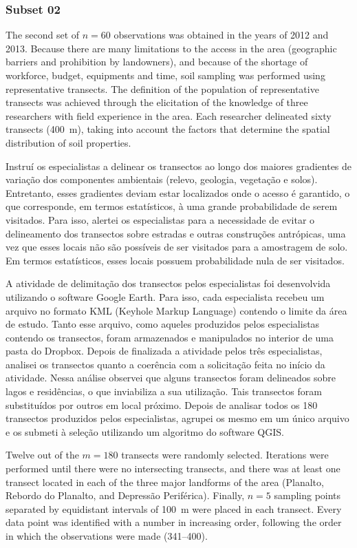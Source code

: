 \subsubsection{Subset 02}

The second set of $n = 60$ observations was obtained in the years of \num{2012} and \num{2013}. Because
there are many limitations to the access in the area (geographic barriers and prohibition by landowners),
and because of the shortage of workforce, budget, equipments and time, soil sampling was performed using 
representative transects. The definition of the population of representative transects was achieved through 
the elicitation of the knowledge of three researchers with field experience in the area. Each researcher 
delineated sixty transects (\SI{400}{\metre}), taking into account the factors that determine the spatial
distribution of soil properties.

Instruí os especialistas a delinear os transectos ao longo dos maiores gradientes de variação dos componentes ambientais (relevo, geologia, vegetação e solos). Entretanto, esses gradientes deviam estar localizados onde o acesso é garantido, o que corresponde, em termos estatísticos, à uma grande probabilidade de serem visitados. Para isso, alertei os especialistas para a necessidade de evitar o delineamento dos transectos sobre estradas e outras construções antrópicas, uma vez que esses locais não são possíveis de ser visitados para a amostragem de solo. Em termos estatísticos, esses locais possuem probabilidade nula de ser visitados.

A atividade de delimitação dos transectos pelos especialistas foi desenvolvida utilizando o software Google Earth. Para isso, cada especialista recebeu um arquivo no formato KML (Keyhole Markup Language) contendo o limite da área de estudo. Tanto esse arquivo, como aqueles produzidos pelos especialistas contendo os transectos, foram armazenados e manipulados no interior de uma pasta do Dropbox. Depois de finalizada a atividade pelos três especialistas, analisei os transectos quanto a coerência com a solicitação feita no início da atividade. Nessa análise observei que alguns transectos foram delineados sobre lagos e residências, o que inviabiliza a sua utilização. Tais transectos foram substituídos por outros em local próximo. Depois de analisar todos os 180 transectos produzidos pelos especialistas, agrupei os mesmo em um único arquivo e os submeti à seleção utilizando um algoritmo do software QGIS.

Twelve out of the $m = 180$ transects were randomly selected. Iterations were performed until there were
no intersecting transects, and there was at least one transect located in each of the three major 
landforms of the area (Planalto, Rebordo do Planalto, and Depressão Periférica). Finally, $n = 5$ 
sampling points separated by equidistant intervals of \SI{100}{\metre} were placed in each transect.
Every data point was identified with a number in increasing order, following the order in which the 
observations were made (\num{341}--\num{400}).

